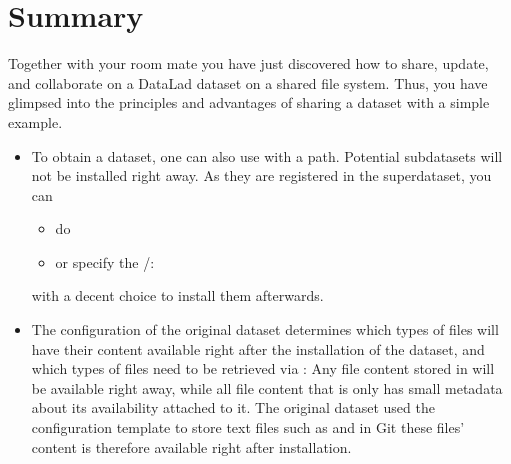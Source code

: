 \section{Summary}
\label{\detokenize{basics/101-120-summary:summary}}\label{\detokenize{basics/101-120-summary:summary-sharelocal}}\label{\detokenize{basics/101-120-summary::doc}}
\sphinxAtStartPar
Together with your room mate you have just discovered how
to share, update, and collaborate on a DataLad dataset on a shared file system.
Thus, you have glimpsed into the principles and advantages of
sharing a dataset with a simple example.
\begin{itemize}
\item {} 
\sphinxAtStartPar
To obtain a dataset, one can also use  with a path.
Potential subdatasets will not be installed right away. As they are registered in
the superdataset, you can
\begin{itemize}
\item {} 
\sphinxAtStartPar
do 

\item {} 
\sphinxAtStartPar
or specify the /: 

\end{itemize}

\sphinxAtStartPar
with a decent  choice to install them afterwards.

\item {} 
\sphinxAtStartPar
The configuration of the original dataset determines which types
of files will have their content available right after the installation of
the dataset, and which types of files need to be retrieved via
: Any file content stored in {\hyperref[\detokenize{glossary:term-Git}]{}} will be available
right away, while all file content that is  only has
small metadata about its availability attached to it. The original
 dataset used the  configuration template
to store text files such as  and 
in Git \textendash{} these files’ content is therefore available right after
installation.


\end{itemize}
